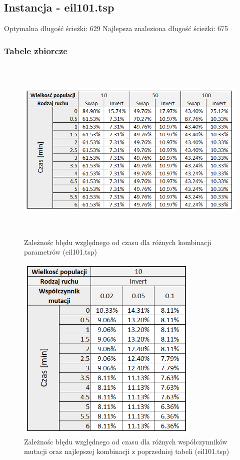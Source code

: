 \documentclass[a4paper,11pt]{article}
\begin{document}
\newpage
\subsection{Instancja - eil101.tsp}

Optymalna długość ścieżki: 629
\newline Najlepsza znaleziona długość ścieżki: 675

\subsubsection{Tabele zbiorcze}


\begin{figure}[H]
\centering
\includegraphics[height=9cm]{t1.PNG}
\caption{Zależnośc błędu względnego od czasu dla różnych kombinacji parametrów (eil101.tsp)}
\end{figure}

\begin{figure}[H]
\centering
\includegraphics[height=9cm]{t4.PNG}
\caption{Zależnośc błędu względnego od czasu dla różnych współczynników mutacji oraz najlepszej kombinacji z poprzedniej tabeli (eil101.tsp)}
\end{figure}
\end{document}
